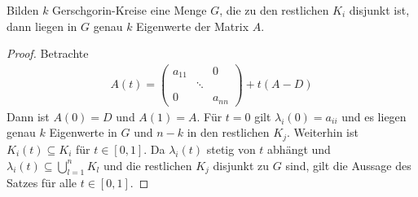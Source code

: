   \begin{Satze}
    Bilden $k$ Gerschgorin-Kreise eine Menge $G$,
    die zu den restlichen $K_i$ disjunkt ist,
    dann liegen in $G$ genau $k$ Eigenwerte der Matrix $A$.

    \begin{proof}
      Betrachte
      \begin{gather*}
        A(t) =
        \begin{pmatrix}
          a_{11} && 0\\
          &\ddots \\
          0 && a_{nn}
        \end{pmatrix}
        +t(A-D)
      \end{gather*}
Dann ist $A(0)=D$ und $A(1)=A$.
Für $t=0$ gilt $\lambda_i(0)=a_{ii}$ und
es liegen genau $k$ Eigenwerte in $G$ und
$n-k$ in den restlichen $K_j$.
Weiterhin ist $K_i(t) \subseteq K_i$ für $t\in[0,1]$.
Da $\lambda_i(t)$ stetig von $t$
abhängt und $\lambda_i(t) \subseteq \bigcup_{l=1}^{n}K_l$
und die restlichen $K_j$ disjunkt zu $G$ sind,
gilt die Aussage des Satzes für alle $t\in[0,1]$.
    \end{proof}
  \end{Satze}


